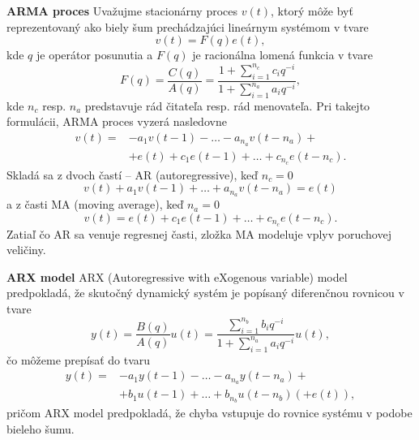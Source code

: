 \textbf{ARMA proces} 
\newline
Uvažujme stacionárny proces $v(t)$, ktorý môže byť reprezentovaný ako biely šum prechádzajúci lineárnym systémom v tvare 
\begin{equation}
	v(t) = F(q)e(t),
\end{equation}
kde $q$ je operátor posunutia a $F(q)$ je racionálna lomená funkcia v tvare 
\begin{equation}
	F(q) = \frac{C(q)}{A(q)} = \frac{1 + \sum_{i=1}^{n_c} c_{i}q^{-i}}{1 + \sum_{i=1}^{n_a} a_{i}q^{-i}},
\end{equation}
kde $n_c$ resp. $n_a$ predstavuje rád čitateľa resp. rád menovateľa. Pri takejto formulácii, ARMA proces vyzerá nasledovne 
\begin{equation}
	\begin{split}
			v(t) = &-a_{1}v(t-1) - \dots -a_{n_a}v(t-n_a) + \\
				   &+e(t) + c_1e(t-1) + \dots + c_{n_c}e(t-n_c).
	\end{split} 
\end{equation}
Skladá sa z dvoch častí -- AR (autoregressive), keď $n_c = 0$
\begin{equation}
	v(t) + a_{1}v(t-1) + \dots + a_{n_a}v(t-n_a) = e(t)
\end{equation}
a z časti MA (moving average), keď $n_a = 0$
\begin{equation}
	v(t) = e(t) + c_1e(t-1) + \dots + c_{n_c}e(t-n_c).
\end{equation}
Zatiaľ čo
AR sa venuje regresnej časti, zložka MA modeluje vplyv poruchovej veličiny.
 
\textbf{ARX model}
\newline
 ARX (Autoregressive with eXogenous variable) model predpokladá, že skutočný dynamický systém je popísaný diferenčnou rovnicou v tvare
 \begin{equation}
 	y(t) = \frac{B(q)}{A(q)}u(t) = \frac{\sum_{i=1}^{n_b} b_{i}q^{-i}}{1 + \sum_{i=1}^{n_a} a_{i}q^{-i}}u(t),
 \end{equation}
 čo môžeme prepísať do tvaru 
 \begin{equation}
	 \begin{split}
		 y(t) = &- a_{1}y(t-1) - \dots - a_{n_a}y(t-n_a) + \\
		 		&+ b_{1}u(t-1) + \dots + b_{n_b}u(t-n_b) \left(+ e(t)\right), 
	 \end{split}
	 \label{eq:ARX_m} 
 \end{equation}
 pričom ARX model predpokladá, že chyba vstupuje do rovnice systému v podobe bieleho šumu.
 
